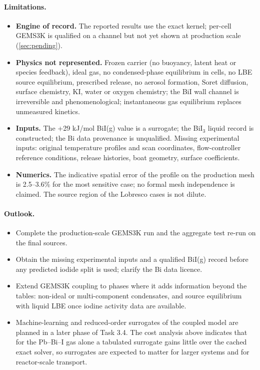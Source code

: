 \documentclass[11pt,a4paper]{article}
\begin{document}
\paragraph{Limitations.}
\begin{itemize}
\item \textbf{Engine of record.} The reported results use the exact
  kernel; per-cell GEMS3K is qualified on a channel but not yet shown at
  production scale (\cref{sec:pending}).
\item \textbf{Physics not represented.} Frozen carrier (no buoyancy,
  latent heat or species feedback), ideal gas, no condensed-phase
  equilibrium in cells, no LBE source equilibrium, prescribed release,
  no aerosol formation, Soret diffusion, surface chemistry, KI, water or
  oxygen chemistry; the BiI wall channel is irreversible and
  phenomenological; instantaneous gas equilibrium replaces unmeasured
  kinetics.
\item \textbf{Inputs.} The +29 kJ/mol BiI(g) value is a surrogate; the
  BiI$_3$ liquid record is constructed; the Bi data provenance is
  unqualified. Missing experimental inputs: original temperature
  profiles and scan coordinates, flow-controller reference conditions,
  release histories, boat geometry, surface coefficients.
\item \textbf{Numerics.} The indicative spatial error of the profile on
  the production mesh is 2.5--3.6\% for the most sensitive case; no
  formal mesh independence is claimed. The source region of the Lobresco
  cases is not dilute.
\end{itemize}

\paragraph{Outlook.}
\begin{itemize}
\item Complete the production-scale GEMS3K run and the aggregate test
  re-run on the final sources.
\item Obtain the missing experimental inputs and a qualified BiI(g)
  record before any predicted iodide split is used; clarify the Bi data
  licence.
\item Extend GEMS3K coupling to phases where it adds information beyond
  the tables: non-ideal or multi-component condensates, and source
  equilibrium with liquid LBE once iodine activity data are available.
\item Machine-learning and reduced-order surrogates of the coupled
  model are planned in a later phase of Task 3.4. The cost analysis
  above indicates that for the Pb--Bi--I gas alone a tabulated surrogate
  gains little over the cached exact solver, so surrogates are expected
  to matter for larger systems and for reactor-scale transport.
\end{itemize}

\small\setlength{\bibsep}{2pt}


\end{document}

